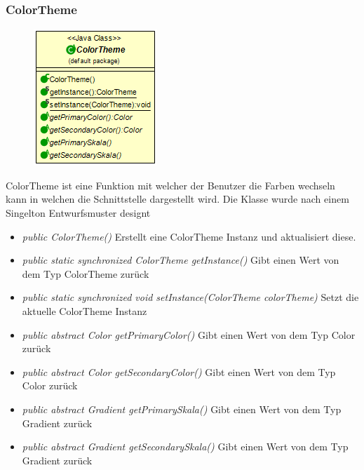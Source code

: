 \begin{itemize} [noitemsep]
\subsubsection{ColorTheme}
\begin{minipage}{0.3\textwidth}
    \begin{figure}[H]
        \includegraphics[scale = 0.5
        ]{media/view/theme/ColorTheme_Class.png}
    \end{figure}
    \end{minipage} \hfill
    \begin{minipage}{0.6\textwidth}

ColorTheme ist eine Funktion mit welcher der Benutzer die Farben wechseln kann in welchen die Schnittstelle dargestellt wird. Die Klasse wurde nach einem Singelton Entwurfsmuster designt
\end{minipage}
\begin{itemize} [noitemsep]
    \item \emph{public ColorTheme()} Erstellt eine ColorTheme Instanz und aktualisiert diese.
    \item \emph{public static synchronized ColorTheme getInstance()} Gibt einen Wert von dem Typ ColorTheme zurück
    \item \emph{public static synchronized void setInstance(ColorTheme colorTheme)} Setzt die aktuelle ColorTheme Instanz
    \item \emph{public abstract Color getPrimaryColor()} Gibt einen Wert von dem Typ Color zurück
    \item \emph{public abstract Color getSecondaryColor()} Gibt einen Wert von dem Typ Color zurück
    \item \emph{public abstract Gradient getPrimarySkala()} Gibt einen Wert von dem Typ Gradient zurück
    \item \emph{public abstract Gradient getSecondarySkala()}  Gibt einen Wert von dem Typ Gradient zurück
\end{itemize}


\end{itemize}
